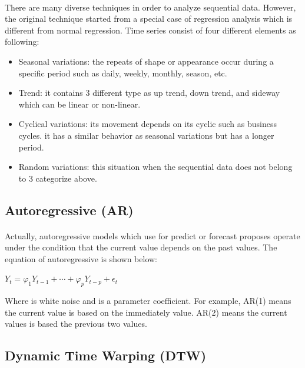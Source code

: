 \paragraph{}
There are many diverse techniques in order to analyze sequential data. However, the original technique started from a special case of regression analysis \cite{dash_2020} which is different from normal regression. Time series consist of four different elements as following:
\begin{itemize}
\item Seasonal variations: the repeats of shape or appearance occur during a specific period such as daily, weekly, monthly, season, etc.
\item Trend: it contains 3 different type as up trend, down trend, and sideway which can be linear or non-linear.
\end{itemize}
\begin{itemize}
\item Cyclical variations: its movement depends on its cyclic such as business cycles. it has a similar behavior as seasonal variations but has a longer period.
\item Random variations: this situation when the sequential data does not belong to 3 categorize above.
\end{itemize}

\subsection{Autoregressive (AR)}
\paragraph{}
Actually, autoregressive models which use for predict or forecast proposes operate under the condition that the current value depends on the past values. The equation of autoregressive is shown below:

\hfil $Y_t = \varphi_1Y_{t-1} + \cdots + \varphi_pY_{t-p} + \epsilon_t $ \par 

Where  is white noise and  is a parameter coefficient. For example, AR(1) means the current value is based on the immediately value. AR(2) means the current values is based the previous two values.

\subsection{Dynamic Time Warping (DTW)}
